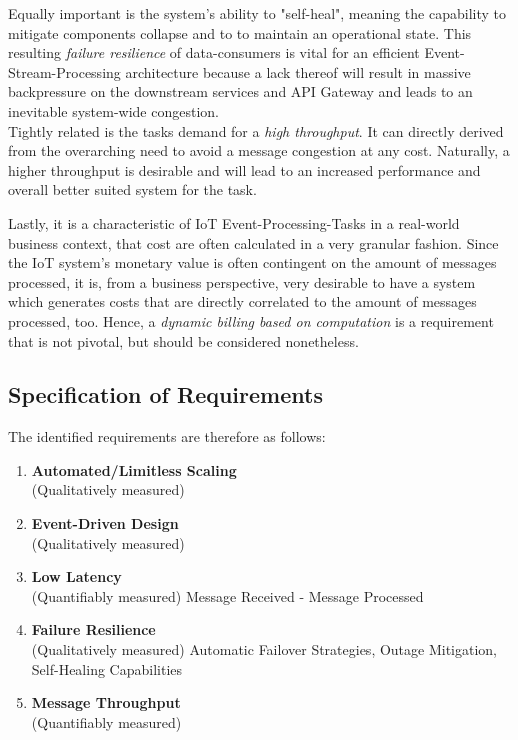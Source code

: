 Equally important is the system's ability to "self-heal", meaning the capability to mitigate components collapse and to to maintain an operational state. This resulting \textit{failure resilience} of data-consumers is vital for an efficient Event-Stream-Processing architecture because a lack thereof will result in massive backpressure on the downstream services and API Gateway and leads to an inevitable system-wide congestion.\\
Tightly related is the tasks demand for a \textit{high throughput}. It can directly derived from the overarching need to avoid a message congestion at any cost. Naturally, a higher throughput is desirable and will lead to an increased performance and overall better suited system for the task.

Lastly, it is a characteristic of IoT Event-Processing-Tasks in a real-world business context, that cost are often calculated in a very granular fashion. Since the IoT system's monetary value is often contingent on the amount of messages processed, it is, from a business perspective, very desirable to have a system which generates costs that are directly correlated to the amount of messages processed, too. Hence, a \textit{dynamic billing based on computation} is a requirement that is not pivotal, but should be considered nonetheless.

\subsection{Specification of Requirements}

The identified requirements are therefore as follows:

\begin{enumerate}
    \item \textbf{Automated/Limitless Scaling}\\
        (Qualitatively measured)
    \item \textbf{Event-Driven Design}\\
        (Qualitatively measured) 
    \item \textbf{Low Latency}\\
        (Quantifiably measured) Message Received - Message Processed
    \item \textbf{Failure Resilience}\\
        (Qualitatively measured) Automatic Failover Strategies, Outage Mitigation, Self-Healing Capabilities
    \item \textbf{Message Throughput}\\
        (Quantifiably measured) 
\end{enumerate}



